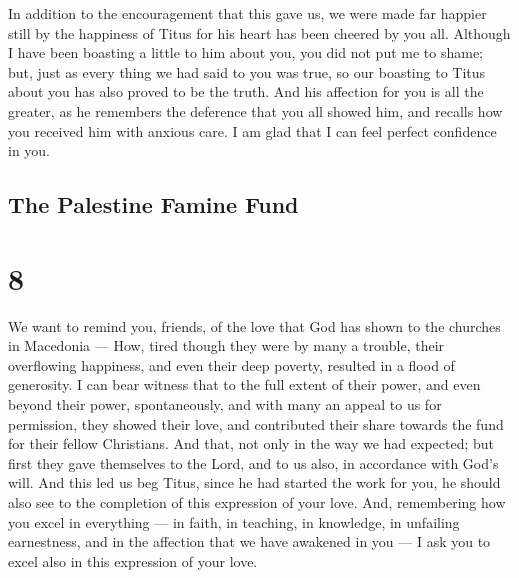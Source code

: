  In addition to the encouragement that this gave us, we
were made far happier still by the happiness of Titus for his heart has
been cheered by you all.  Although I have been boasting a
little to him about you, you did not put me to shame; but, just as every
thing we had said to you was true, so our boasting to Titus about you
has also proved to be the truth.  And his affection for you
is all the greater, as he remembers the deference that you all showed
him, and recalls how you received him with anxious care.  I
am glad that I can feel perfect confidence in you.

\hypertarget{the-palestine-famine-fund}{%
\subsection{The Palestine Famine Fund}\label{the-palestine-famine-fund}}

\hypertarget{section-6}{%
\section{8}\label{section-6}}

 We want to remind you, friends, of the love that God has
shown to the churches in Macedonia ---  How, tired though
they were by many a trouble, their overflowing happiness, and even their
deep poverty, resulted in a flood of generosity.  I can bear
witness that to the full extent of their power, and even beyond their
power, spontaneously,  and with many an appeal to us for
permission, they showed their love, and contributed their share towards
the fund for their fellow Christians.  And that, not only in
the way we had expected; but first they gave themselves to the Lord, and
to us also, in accordance with God's will.  And this led us
beg Titus, since he had started the work for you, he should also see to
the completion of this expression of your love.  And,
remembering how you excel in everything --- in faith, in teaching, in
knowledge, in unfailing earnestness, and in the affection that we have
awakened in you --- I ask you to excel also in this expression of your
love.

